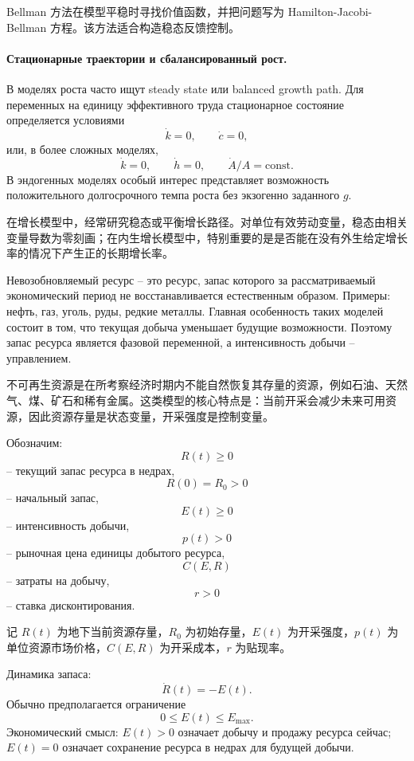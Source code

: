 \documentclass[12pt,a4paper]{article}
\newcommand{\zh}[1]{\par\noindent #1\par}
\begin{document}
\zh{Bellman 方法在模型平稳时寻找价值函数，并把问题写为 Hamilton-Jacobi-Bellman 方程。该方法适合构造稳态反馈控制。}

\paragraph{Стационарные траектории и сбалансированный рост.}
В моделях роста часто ищут steady state или balanced growth path. Для переменных на единицу эффективного труда стационарное состояние определяется условиями
\[
\dot k=0,\qquad \dot c=0,
\]
или, в более сложных моделях,
\[
\dot k=0,\qquad \dot h=0,\qquad \dot A/A=\mathrm{const}.
\]
В эндогенных моделях особый интерес представляет возможность положительного долгосрочного темпа роста без экзогенно заданного $g$.

\zh{在增长模型中，经常研究稳态或平衡增长路径。对单位有效劳动变量，稳态由相关变量导数为零刻画；在内生增长模型中，特别重要的是是否能在没有外生给定增长率的情况下产生正的长期增长率。}



Невозобновляемый ресурс -- это ресурс, запас которого за рассматриваемый экономический период не восстанавливается естественным образом. Примеры: нефть, газ, уголь, руды, редкие металлы. Главная особенность таких моделей состоит в том, что текущая добыча уменьшает будущие возможности. Поэтому запас ресурса является фазовой переменной, а интенсивность добычи -- управлением.

\zh{不可再生资源是在所考察经济时期内不能自然恢复其存量的资源，例如石油、天然气、煤、矿石和稀有金属。这类模型的核心特点是：当前开采会减少未来可用资源，因此资源存量是状态变量，开采强度是控制变量。}

Обозначим:
\[
R(t)\ge 0
\]
-- текущий запас ресурса в недрах,
\[
R(0)=R_0>0
\]
-- начальный запас,
\[
E(t)\ge 0
\]
-- интенсивность добычи,
\[
p(t)>0
\]
-- рыночная цена единицы добытого ресурса,
\[
C(E,R)
\]
-- затраты на добычу,
\[
r>0
\]
-- ставка дисконтирования.

\zh{记 $R(t)$ 为地下当前资源存量，$R_0$ 为初始存量，$E(t)$ 为开采强度，$p(t)$ 为单位资源市场价格，$C(E,R)$ 为开采成本，$r$ 为贴现率。}

Динамика запаса:
\[
\dot R(t)=-E(t).
\]
Обычно предполагается ограничение
\[
0\le E(t)\le E_{\max}.
\]
Экономический смысл: $E(t)>0$ означает добычу и продажу ресурса сейчас; $E(t)=0$ означает сохранение ресурса в недрах для будущей добычи.
\end{document}

